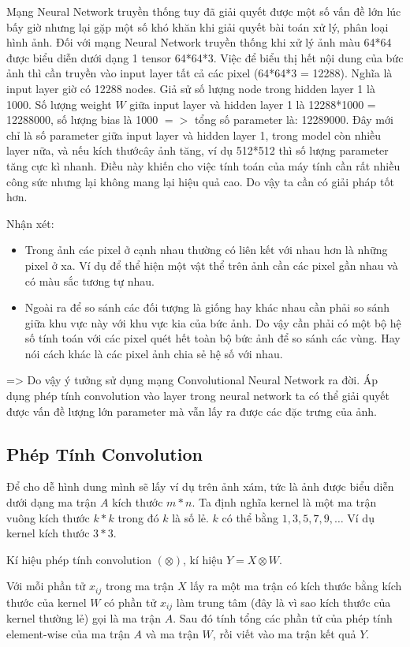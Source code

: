 Mạng Neural Network truyền thống tuy đã giải quyết  được một số vấn đề lớn lúc bấy giờ nhưng lại gặp một số khó khăn khi giải quyết bài toán xử lý, phân loại hình ảnh.
Đối với mạng Neural Network truyền thống khi xử lý ảnh màu 64*64 được biểu diễn dưới dạng 1 tensor 64*64*3. Việc để biểu thị hết nội dung của bức ảnh thì cần truyền vào input layer tất cả các pixel (64*64*3 = 12288). Nghĩa là input layer giờ có 12288 nodes. Giả sử số lượng node trong hidden layer 1 là 1000. Số lượng weight $W$ giữa input layer và hidden layer 1 là 12288*1000 = 12288000, số lượng bias là 1000 $=>$ tổng số parameter là: 12289000. Đây mới chỉ là số parameter giữa input layer và hidden layer 1, trong model còn nhiều layer nữa, và nếu kích thướcây ảnh tăng, ví dụ 512*512 thì số lượng parameter tăng cực kì nhanh. Điều này khiến cho việc tính toán của máy tính cần rất nhiều công sức nhưng lại không mang lại hiệu quả cao. Do vậy ta cần có giải pháp tốt hơn.

Nhận xét:
\begin{itemize}
\item Trong ảnh các pixel ở cạnh nhau thường có liên kết với nhau hơn là những pixel ở xa. Ví dụ để thể hiện một vật thể trên ảnh cần các pixel gần nhau và có màu sắc tương tự nhau.
\item Ngoài ra để so sánh các đối tượng là giống hay khác nhau cần phải so sánh giữa khu vực này với khu vực kia của bức ảnh. Do vậy cần phải có một bộ hệ số tính toán với các pixel quét hết toàn bộ bức ảnh để so sánh các vùng. Hay nói cách khác là các pixel ảnh chia sẻ hệ số với nhau.
\end{itemize}
=> Do vậy ý tưởng sử dụng mạng Convolutional Neural Network ra đời. Áp dụng phép tính convolution vào layer trong neural network ta có thể giải quyết được vấn đề lượng lớn parameter mà vẫn lấy ra được các đặc trưng của ảnh.
\subsection{Phép Tính Convolution}
\label{ss: convolution}
Để cho dễ hình dung mình sẽ lấy ví dụ trên ảnh xám, tức là ảnh được biểu diễn dưới dạng ma trận $A$ kích thước $m*n$.
Ta định nghĩa kernel là một ma trận vuông kích thước $k*k$ trong đó $k$ là số lẻ. $k$ có thể bằng $1, 3, 5, 7, 9,…$ Ví dụ kernel kích thước $3*3$.

Kí hiệu phép tính convolution $(\otimes)$, kí hiệu $Y = X \otimes W$.

Với mỗi phần tử $x_{ij}$ trong ma trận $X$ lấy ra một ma trận có kích thước bằng kích thước của kernel $W$ có phần tử $x_{ij}$ làm trung tâm (đây là vì sao kích thước của kernel thường lẻ) gọi là ma trận $A$. Sau đó tính tổng các phần tử của phép tính element-wise của ma trận $A$ và ma trận $W$, rồi viết vào ma trận kết quả $Y$.

